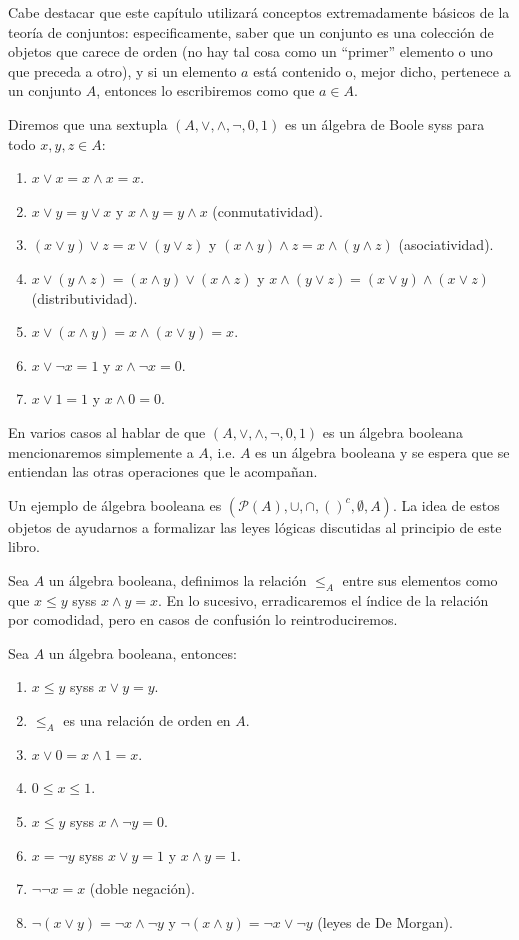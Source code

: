 \documentclass[11pt,a4paper]{book}
\renewcommand{\P}{\mathcal{P}}
\begin{document}
Cabe destacar que este capítulo utilizará conceptos extremadamente básicos de la teoría de conjuntos: especificamente, saber que un conjunto es una colección de objetos que carece de orden (no hay tal cosa como un ``primer'' elemento o uno que preceda a otro), y si un elemento $a$ está contenido o, mejor dicho, pertenece a un conjunto $A$, entonces lo escribiremos como que $a\in A$.
\begin{mydef}
	Diremos que una sextupla $(A,\vee,\wedge,\neg,0,1)$ es un álgebra de Boole syss para todo $x,y,z\in A$:
	\begin{enumerate}
		\item $x\vee x=x\wedge x=x$.
		\item $x\vee y=y\vee x$ y $x\wedge y=y\wedge x$ (conmutatividad).
		\item $(x\vee y)\vee z=x\vee(y\vee z)$ y $(x\wedge y)\wedge z=x\wedge(y\wedge z)$ (asociatividad).
		\item $x\vee(y\wedge z)=(x\wedge y)\vee(x\wedge z)$ y $x\wedge(y\vee z)=(x\vee y)\wedge(x\vee z)$ (distributividad).
		\item $x\vee(x\wedge y)=x\wedge(x\vee y)=x$.
		\item $x\vee\neg x=1$ y $x\wedge\neg x=0$.
		\item $x\vee 1=1$ y $x\wedge 0=0$.
	\end{enumerate}
	En varios casos al hablar de que $(A,\vee,\wedge,\neg,0,1)$ es un álgebra booleana mencionaremos simplemente a $A$, i.e. $A$ es un álgebra booleana y se espera que se entiendan las otras operaciones que le acompañan.
\end{mydef}
Un ejemplo de álgebra booleana es $(\P(A),\cup,\cap,()^c,\emptyset,A)$. La idea de estos objetos de ayudarnos a formalizar las leyes lógicas discutidas al principio de este libro.
\begin{mydef}
	Sea $A$ un álgebra booleana, definimos la relación $\leq_A$ entre sus elementos como que $x\leq y$ syss $x\wedge y=x$. En lo sucesivo, erradicaremos el índice de la relación por comodidad, pero en casos de confusión lo reintroduciremos.
\end{mydef}
\begin{prop}
	Sea $A$ un álgebra booleana, entonces:
	\begin{enumerate}
		\item $x\leq y$ syss $x\vee y=y$.
		\item $\leq_A$ es una relación de orden en $A$.
		\item $x\vee 0=x\wedge 1=x$.
		\item $0\leq x\leq 1$.
		\item $x\leq y$ syss $x\wedge\neg y=0$.
		\item $x=\neg y$ syss $x\vee y=1$ y $x\wedge y=1$.
		\item $\neg\neg x=x$ (doble negación).
		\item $\neg(x\vee y)=\neg x\wedge\neg y$ y $\neg(x\wedge y)=\neg x\vee\neg y$ (leyes de De Morgan).
	\end{enumerate}
\end{prop}
\end{document}
